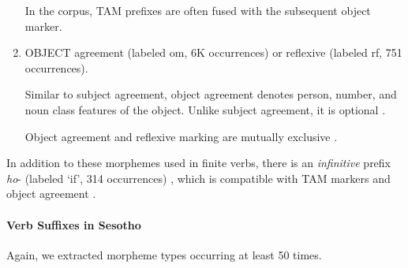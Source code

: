 \documentclass[11pt,letterpaper]{article}
\begin{document}
\begin{enumerate}
    
    
    In the corpus, TAM prefixes are often fused with the subsequent object marker.
    
    
    
    \item OBJECT agreement (labeled om, 6K occurrences) or reflexive (labeled rf, 751 occurrences).
    
    Similar to subject agreement, object agreement denotes person, number, and noun class features of the object.
    Unlike subject agreement, it is optional \cite[]{doke1967textbook}.
    
    Object agreement and reflexive marking are mutually exclusive \cite[p. 165]{guma1971outline}.
\end{enumerate}

In addition to these morphemes used in finite verbs, there is an \textit{infinitive} prefix \textit{ho}- (labeled `if', 314 occurrences) \cite[\textsection{}-384]{doke1967textbook}, which is compatible with TAM markers \cite[]{doke1967textbook} and object agreement \cite[]{doke1967textbook}.








\paragraph{Verb Suffixes in Sesotho}

Again, we extracted morpheme types occurring at least 50 times.
\end{document}
